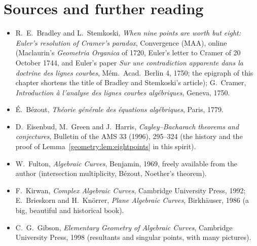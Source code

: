 \section*{Sources and further reading}

\begin{itemize}
\item R.~E.~Bradley and L.~Stemkoski, \emph{When nine points are worth but eight: Euler's resolution of Cramer's paradox}, Convergence (MAA), online (Maclaurin's
\emph{Geometria Organica} of 1720, Euler's letter to Cramer of 20 October 1744, and Euler's paper \emph{Sur une contradiction apparente dans la doctrine des
lignes courbes}, M\'em.\ Acad.\ Berlin 4, 1750; the epigraph of this chapter shortens the title of Bradley and Stemkoski's article); G.~Cramer, \emph{Introduction \`a l'analyse des lignes courbes
alg\'ebriques}, Geneva, 1750.
\item \'E.~B\'ezout, \emph{Th\'eorie g\'en\'erale des \'equations alg\'ebriques}, Paris, 1779.
\item D.~Eisenbud, M.~Green and J.~Harris, \emph{Cayley--Bacharach theorems and conjectures}, Bulletin of the AMS 33 (1996), 295--324 (the history and the proof
of Lemma~\ref{geometry:lem:eightpoints} in this spirit).
\item W.~Fulton, \emph{Algebraic Curves}, Benjamin, 1969, freely available from the author (intersection multiplicity, B\'ezout, Noether's theorem).
\item F.~Kirwan, \emph{Complex Algebraic Curves}, Cambridge University Press, 1992; E.~Brieskorn and H.~Kn\"orrer, \emph{Plane Algebraic Curves}, Birkh\"auser,
1986 (a big, beautiful and historical book).
\item C.~G.~Gibson, \emph{Elementary Geometry of Algebraic Curves}, Cambridge University Press, 1998 (resultants and singular points, with many pictures).
\end{itemize}
